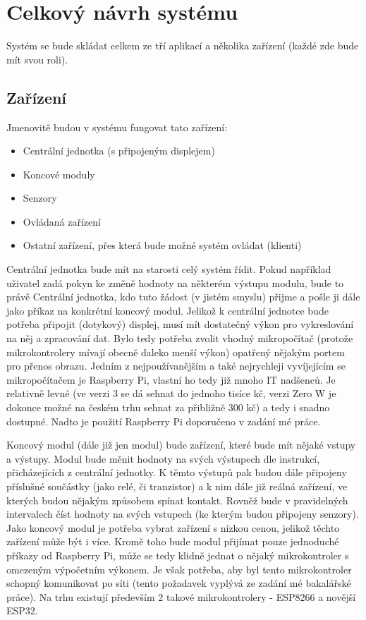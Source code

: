 \section{Celkový návrh systému}
Systém se bude skládat celkem ze tří aplikací a několika zařízení (každé zde bude mít svou roli). 

\subsection*{Zařízení}
Jmenovitě budou v systému fungovat tato zařízení:
\begin{itemize}
    \item Centrální jednotka (s připojeným displejem)
    \item Koncové moduly
    \item Senzory
    \item Ovládaná zařízení
    \item Ostatní zařízení, přes která bude možné systém ovládat (klienti)
\end{itemize}

Centrální jednotka bude mít na starosti celý systém řídit. Pokud například uživatel zadá pokyn ke změně hodnoty na některém výstupu modulu, bude to právě Centrální jednotka, kdo tuto žádost (v jistém smyslu) přijme a pošle ji dále jako příkaz na konkrétní koncový modul.
Jelikož k centrální jednotce bude potřeba připojit (dotykový) displej, musí mít dostatečný výkon pro vykreslování na něj a zpracování dat. Bylo tedy potřeba zvolit vhodný mikropočítač (protože mikrokontrolery mívají obecně daleko menší výkon) opatřený nějakým portem pro přenos obrazu. Jedním z nejpoužívanějším a také nejrychleji vyvíjejícím se mikropočítačem je Raspberry Pi, vlastní ho tedy již mnoho IT nadšenců. Je relativně levné (ve verzi 3 se dá sehnat do jednoho tisíce kč, verzi Zero W je dokonce možné na českém trhu sehnat za přibližně 300 kč) a tedy i snadno dostupné. Nadto je použití Raspberry Pi doporučeno v zadání mé práce.

Koncový modul (dále již jen modul) bude zařízení, které bude mít nějaké vstupy a výstupy. Modul bude měnit hodnoty na svých výstupech dle instrukcí, přicházejících z centrální jednotky. K těmto výstupů pak budou dále připojeny příslušné součástky (jako relé, či tranzistor) a k nim dále již reálná zařízení, ve kterých budou nějakým způsobem spínat kontakt. Rovněž bude v pravidelných intervalech číst hodnoty na svých vstupech (ke kterým budou připojeny senzory). Jako koncový modul je potřeba vybrat zařízení s nízkou cenou, jelikož těchto zařízení může být i více. Kromě toho bude modul přijímat pouze jednoduché příkazy od Raspberry Pi, může se tedy klidně jednat o nějaký mikrokontroler s omezeným výpočetním výkonem. Je však potřeba, aby byl tento mikrokontroler schopný komunikovat po síti (tento požadavek vyplývá ze zadání mé bakalářské práce). Na trhu existují především 2 takové mikrokontrolery - ESP8266 a novější ESP32.

